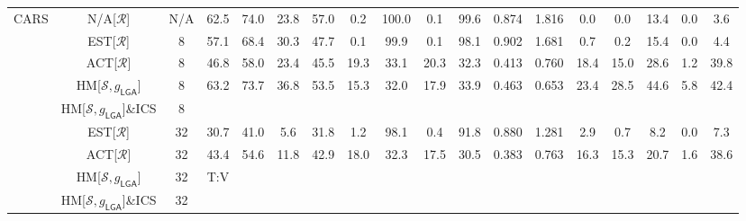 \begin{table*}
{\begin{tabular}{c|cc|cccc|ccccc|ccccc|c}
	\midrule

\multirow{9}{*}{CARS} & N/A{[}$\mathcal{R}${]} & N/A & 62.5 & 74.0 & 23.8 & 57.0 & 0.2 & 100.0 & 0.1 & 99.6 & 0.874 & 1.816 & 0.0 & 0.0 & 13.4 & 0.0 & 3.6\tabularnewline
\cline{2-18} \cline{3-18} \cline{4-18} \cline{5-18} \cline{6-18} \cline{7-18} \cline{8-18} \cline{9-18} \cline{10-18} \cline{11-18} \cline{12-18} \cline{13-18} \cline{14-18} \cline{15-18} \cline{16-18} \cline{17-18} \cline{18-18}
 & EST{[}$\mathcal{R}${]} & 8 & 57.1 & 68.4 & 30.3 & 47.7 & 0.1 & 99.9 & 0.1 & 98.1 & 0.902 & 1.681 & 0.7 & 0.2 & 15.4 & 0.0 & 4.4\tabularnewline
 & ACT{[}$\mathcal{R}${]} & 8 & 46.8 & 58.0 & 23.4 & 45.5 & 19.3 & 33.1 & 20.3 & 32.3 & 0.413 & 0.760 & 18.4 & 15.0 & 28.6 & 1.2 & 39.8\tabularnewline
 & HM{[}$\mathcal{S},g_{\mathsf{LGA}}${]} & 8 & 63.2 & 73.7 & 36.8 & 53.5 & 15.3 & 32.0 & 17.9 & 33.9 & 0.463 & 0.653 & 23.4 & 28.5 & 44.6 & 5.8 & 42.4\tabularnewline
 & HM{[}$\mathcal{S},g_{\mathsf{LGA}}${]}\&ICS & 8 &  &  &  &  &  &  &  &  &  &  &  &  &  &  & \tabularnewline
\cline{2-18} \cline{3-18} \cline{4-18} \cline{5-18} \cline{6-18} \cline{7-18} \cline{8-18} \cline{9-18} \cline{10-18} \cline{11-18} \cline{12-18} \cline{13-18} \cline{14-18} \cline{15-18} \cline{16-18} \cline{17-18} \cline{18-18}
 & EST{[}$\mathcal{R}${]} & 32 & 30.7 & 41.0 & 5.6 & 31.8 & 1.2 & 98.1 & 0.4 & 91.8 & 0.880 & 1.281 & 2.9 & 0.7 & 8.2 & 0.0 & 7.3\tabularnewline
 & ACT{[}$\mathcal{R}${]} & 32 & 43.4 & 54.6 & 11.8 & 42.9 & 18.0 & 32.3 & 17.5 & 30.5 & 0.383 & 0.763 & 16.3 & 15.3 & 20.7 & 1.6 & 38.6\tabularnewline
 & HM{[}$\mathcal{S},g_{\mathsf{LGA}}${]} & 32 & T:V &  &  &  &  &  &  &  &  &  &  &  &  &  & \tabularnewline
 & HM{[}$\mathcal{S},g_{\mathsf{LGA}}${]}\&ICS & 32 &  &  &  &  &  &  &  &  &  &  &  &  &  &  & \tabularnewline

	\midrule


\end{tabular}}
\end{table*}
